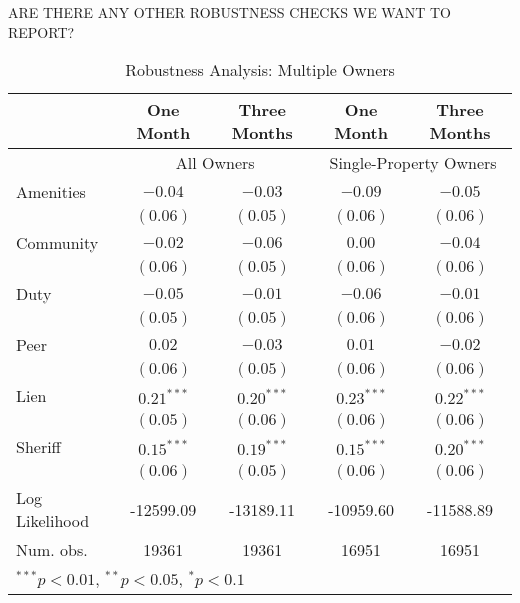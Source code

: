 \documentclass[12pt]{article}
\begin{document}
\bigskip

\noindent ARE THERE ANY OTHER ROBUSTNESS CHECKS WE WANT TO REPORT?

\begin{table}[htbp]
\caption{Robustness Analysis: Multiple Owners}\label{sh_logit_rob}
\begin{center}
\begin{tabular}{l c c c c }
\hline
               & One Month & Three Months  & One Month & Three Months  \\
\hline
 & \multicolumn{2}{c}{All Owners} & \multicolumn{2}{c}{Single-Property Owners} \\
Amenities      & $-0.04$      & $-0.03$         & $-0.09$      & $-0.05$          \\
               & $(0.06)$     & $(0.05)$         & $(0.06)$     & $(0.06)$        \\
Community          & $-0.02$      & $-0.06$          & $0.00$       & $-0.04$        \\
               & $(0.06)$     & $(0.05)$        & $(0.06)$     & $(0.06)$       \\
Duty           & $-0.05$      & $-0.01$         & $-0.06$      & $-0.01$       \\
               & $(0.05)$     & $(0.05)$        & $(0.06)$     & $(0.06)$      \\
Peer           & $0.02$       & $-0.03$         & $0.01$       & $-0.02$        \\
               & $(0.06)$     & $(0.05)$       & $(0.06)$     & $(0.06)$     \\
Lien           & $0.21^{***}$ & $0.20^{***}$  & $0.23^{***}$ & $0.22^{***}$  \\
               & $(0.05)$     & $(0.06)$        & $(0.06)$     & $(0.06)$       \\
Sheriff        & $0.15^{***}$ & $0.19^{***}$  & $0.15^{***}$ & $0.20^{***}$  \\
               & $(0.06)$     & $(0.05)$        & $(0.06)$     & $(0.06)$     \\
\hline
Log Likelihood & -12599.09    & -13189.11     & -10959.60    & -11588.89       \\
Num. obs.      & 19361        & 19361              & 16951        & 16951            \\
\hline
\multicolumn{5}{l}{\scriptsize{$^{***}p<0.01$, $^{**}p<0.05$, $^*p<0.1$}}
\end{tabular}
\end{center}
\end{table}
\end{document}
